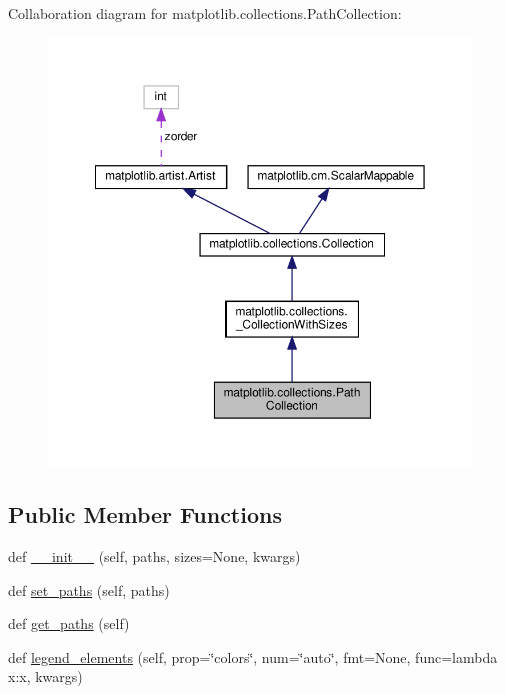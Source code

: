 Collaboration diagram for matplotlib.\+collections.\+Path\+Collection\+:
\nopagebreak
\begin{figure}[H]
\begin{center}
\leavevmode
\includegraphics[width=350pt]{classmatplotlib_1_1collections_1_1PathCollection__coll__graph}
\end{center}
\end{figure}
\subsection*{Public Member Functions}
\begin{DoxyCompactItemize}
\item 
def \hyperlink{classmatplotlib_1_1collections_1_1PathCollection_a494f67a1ee1481a8ece37908357e79c7}{\+\_\+\+\_\+init\+\_\+\+\_\+} (self, paths, sizes=None, kwargs)
\item 
def \hyperlink{classmatplotlib_1_1collections_1_1PathCollection_a896988df6769d687c6845fb43824d0fc}{set\+\_\+paths} (self, paths)
\item 
def \hyperlink{classmatplotlib_1_1collections_1_1PathCollection_a3df317b92612cb11c9927861338bf45a}{get\+\_\+paths} (self)
\item 
def \hyperlink{classmatplotlib_1_1collections_1_1PathCollection_a2be255d5b379e46ef788a227bc4d4221}{legend\+\_\+elements} (self, prop=\char`\"{}colors\char`\"{}, num=\char`\"{}auto\char`\"{}, fmt=None, func=lambda x\+:x, kwargs)
\end{DoxyCompactItemize}
